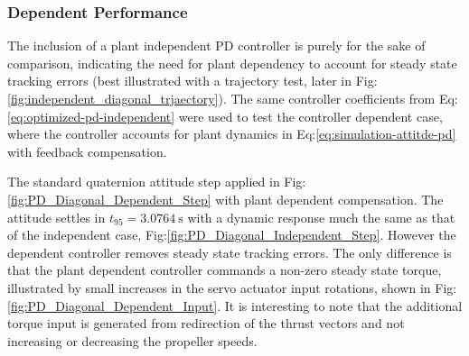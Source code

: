 \subsubsection{Dependent Performance}
\label{subsubsec:simulation.atttiude.pd.dependent}
The inclusion of a plant independent PD controller is purely for the sake of comparison, indicating the need for plant dependency to account for steady state tracking errors (best illustrated with a trajectory test, later in Fig:\ref{fig:independent_diagonal_trjaectory}). The same controller coefficients from Eq:\ref{eq:optimized-pd-independent} were used to test the controller dependent case, where the controller accounts for plant dynamics in Eq:\ref{eq:simulation-attitde-pd} with feedback compensation.
\par
The standard quaternion attitude step applied in Fig:\ref{fig:PD_Diagonal_Dependent_Step} with plant dependent compensation. The attitude settles in $t_{95}=3.0764~\text{s}$ with a dynamic response much the same as that of the independent case, Fig:\ref{fig:PD_Diagonal_Independent_Step}. However the dependent controller removes steady state tracking errors. The only difference is that the plant dependent controller commands a non-zero steady state torque, illustrated by small increases in the servo actuator input rotations, shown in Fig:\ref{fig:PD_Diagonal_Dependent_Input}. It is interesting to note that the additional torque input is generated from redirection of the thrust vectors and not increasing or decreasing the propeller speeds.
\par
